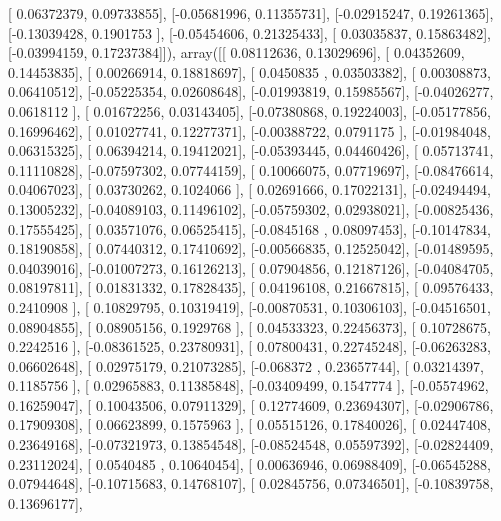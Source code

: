 \documentclass{article}
\begin{document}
       [ 0.06372379,  0.09733855],
       [-0.05681996,  0.11355731],
       [-0.02915247,  0.19261365],
       [-0.13039428,  0.1901753 ],
       [-0.05454606,  0.21325433],
       [ 0.03035837,  0.15863482],
       [-0.03994159,  0.17237384]]), array([[ 0.08112636,  0.13029696],
       [ 0.04352609,  0.14453835],
       [ 0.00266914,  0.18818697],
       [ 0.0450835 ,  0.03503382],
       [ 0.00308873,  0.06410512],
       [-0.05225354,  0.02608648],
       [-0.01993819,  0.15985567],
       [-0.04026277,  0.0618112 ],
       [ 0.01672256,  0.03143405],
       [-0.07380868,  0.19224003],
       [-0.05177856,  0.16996462],
       [ 0.01027741,  0.12277371],
       [-0.00388722,  0.0791175 ],
       [-0.01984048,  0.06315325],
       [ 0.06394214,  0.19412021],
       [-0.05393445,  0.04460426],
       [ 0.05713741,  0.11110828],
       [-0.07597302,  0.07744159],
       [ 0.10066075,  0.07719697],
       [-0.08476614,  0.04067023],
       [ 0.03730262,  0.1024066 ],
       [ 0.02691666,  0.17022131],
       [-0.02494494,  0.13005232],
       [-0.04089103,  0.11496102],
       [-0.05759302,  0.02938021],
       [-0.00825436,  0.17555425],
       [ 0.03571076,  0.06525415],
       [-0.0845168 ,  0.08097453],
       [-0.10147834,  0.18190858],
       [ 0.07440312,  0.17410692],
       [-0.00566835,  0.12525042],
       [-0.01489595,  0.04039016],
       [-0.01007273,  0.16126213],
       [ 0.07904856,  0.12187126],
       [-0.04084705,  0.08197811],
       [ 0.01831332,  0.17828435],
       [ 0.04196108,  0.21667815],
       [ 0.09576433,  0.2410908 ],
       [ 0.10829795,  0.10319419],
       [-0.00870531,  0.10306103],
       [-0.04516501,  0.08904855],
       [ 0.08905156,  0.1929768 ],
       [ 0.04533323,  0.22456373],
       [ 0.10728675,  0.2242516 ],
       [-0.08361525,  0.23780931],
       [ 0.07800431,  0.22745248],
       [-0.06263283,  0.06602648],
       [ 0.02975179,  0.21073285],
       [-0.068372  ,  0.23657744],
       [ 0.03214397,  0.1185756 ],
       [ 0.02965883,  0.11385848],
       [-0.03409499,  0.1547774 ],
       [-0.05574962,  0.16259047],
       [ 0.10043506,  0.07911329],
       [ 0.12774609,  0.23694307],
       [-0.02906786,  0.17909308],
       [ 0.06623899,  0.1575963 ],
       [ 0.05515126,  0.17840026],
       [ 0.02447408,  0.23649168],
       [-0.07321973,  0.13854548],
       [-0.08524548,  0.05597392],
       [-0.02824409,  0.23112024],
       [ 0.0540485 ,  0.10640454],
       [ 0.00636946,  0.06988409],
       [-0.06545288,  0.07944648],
       [-0.10715683,  0.14768107],
       [ 0.02845756,  0.07346501],
       [-0.10839758,  0.13696177],
\end{document}
